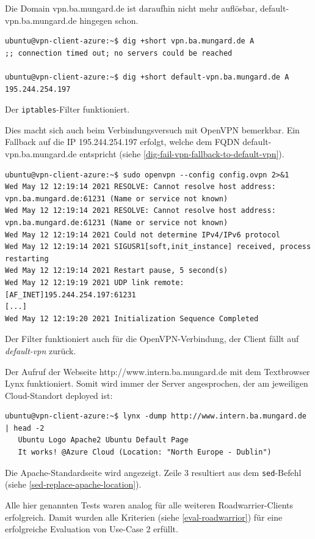 Die Domain vpn.ba.mungard.de ist daraufhin nicht mehr auflösbar, default-vpn.ba.mungard.de hingegen schon.
\begin{listing}[h]
\begin{verbatim}
ubuntu@vpn-client-azure:~$ dig +short vpn.ba.mungard.de A
;; connection timed out; no servers could be reached

ubuntu@vpn-client-azure:~$ dig +short default-vpn.ba.mungard.de A
195.244.254.197

\end{verbatim}
\caption{Der \texttt{iptables}-Filter funktioniert.}
\label{dig-fail-vpn-fallback-to-default-vpn}
\end{listing}\FloatBarrier
Dies macht sich auch beim Verbindungsversuch mit OpenVPN bemerkbar. Ein Fallback auf die IP 195.244.254.197 erfolgt, welche dem FQDN default-vpn.ba.mungard.de entspricht (siehe \ref{dig-fail-vpn-fallback-to-default-vpn}).
\begin{listing}[h]
\begin{verbatim}
ubuntu@vpn-client-azure:~$ sudo openvpn --config config.ovpn 2>&1
Wed May 12 12:19:14 2021 RESOLVE: Cannot resolve host address: vpn.ba.mungard.de:61231 (Name or service not known)
Wed May 12 12:19:14 2021 RESOLVE: Cannot resolve host address: vpn.ba.mungard.de:61231 (Name or service not known)
Wed May 12 12:19:14 2021 Could not determine IPv4/IPv6 protocol
Wed May 12 12:19:14 2021 SIGUSR1[soft,init_instance] received, process restarting
Wed May 12 12:19:14 2021 Restart pause, 5 second(s)
Wed May 12 12:19:19 2021 UDP link remote: [AF_INET]195.244.254.197:61231
[...]
Wed May 12 12:19:20 2021 Initialization Sequence Completed

\end{verbatim}
\caption{Der Filter funktioniert auch für die OpenVPN-Verbindung, der Client fällt auf \textit{default-vpn} zurück.}
\label{connection-fail-vpn-fallback-default-vpn}
\end{listing}\FloatBarrier

Der Aufruf der Webseite \glqq http://www.intern.ba.mungard.de\grqq{} mit dem Textbrowser Lynx funktioniert. Somit wird immer der Server angesprochen, der am jeweiligen Cloud-Standort deployed ist:
\begin{listing}[h]
\begin{verbatim}
ubuntu@vpn-client-azure:~$ lynx -dump http://www.intern.ba.mungard.de | head -2
   Ubuntu Logo Apache2 Ubuntu Default Page
   It works! @Azure Cloud (Location: "North Europe - Dublin")

\end{verbatim}
\caption{Die Apache-Standardseite wird angezeigt. Zeile 3 resultiert aus dem \texttt{sed}-Befehl (siehe \ref{sed-replace-apache-location}).}
\label{lynx-default-page}
\end{listing}\FloatBarrier
Alle hier genannten Tests waren analog für alle weiteren Roadwarrier-Clients erfolgreich. Damit wurden alle Kriterien (siehe \ref{eval-roadwarrior}) für eine erfolgreiche Evaluation von Use-Case 2 erfüllt.



